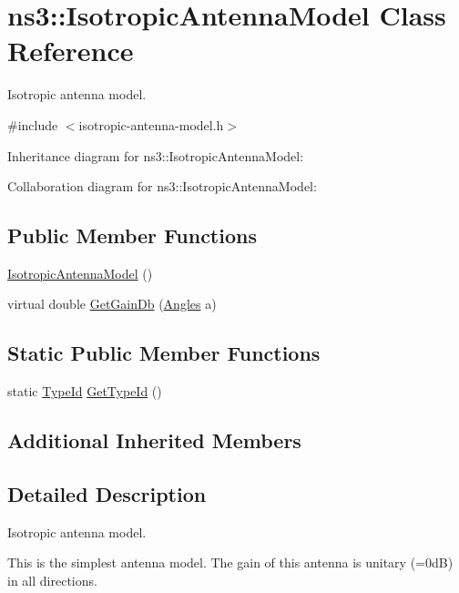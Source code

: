 \hypertarget{classns3_1_1IsotropicAntennaModel}{}\section{ns3\+:\+:Isotropic\+Antenna\+Model Class Reference}
\label{classns3_1_1IsotropicAntennaModel}


Isotropic antenna model.  




{\ttfamily \#include $<$isotropic-\/antenna-\/model.\+h$>$}



Inheritance diagram for ns3\+:\+:Isotropic\+Antenna\+Model\+:


Collaboration diagram for ns3\+:\+:Isotropic\+Antenna\+Model\+:
\subsection*{Public Member Functions}
\begin{DoxyCompactItemize}
\item 
\hyperlink{classns3_1_1IsotropicAntennaModel_a30daadd8cae70dfc69e2e6bc530dee3c}{Isotropic\+Antenna\+Model} ()
\item 
virtual double \hyperlink{classns3_1_1IsotropicAntennaModel_a7321a0ede922ecccee46878d550d0d93}{Get\+Gain\+Db} (\hyperlink{structns3_1_1Angles}{Angles} a)
\end{DoxyCompactItemize}
\subsection*{Static Public Member Functions}
\begin{DoxyCompactItemize}
\item 
static \hyperlink{classns3_1_1TypeId}{Type\+Id} \hyperlink{classns3_1_1IsotropicAntennaModel_a028bb9c62be849c5c39e9948e8d2d782}{Get\+Type\+Id} ()
\end{DoxyCompactItemize}
\subsection*{Additional Inherited Members}


\subsection{Detailed Description}
Isotropic antenna model. 

This is the simplest antenna model. The gain of this antenna is unitary (=0dB) in all directions. 


